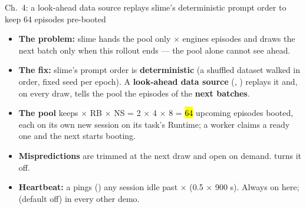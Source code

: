 \begin{frame}{Ch.\ 4: a look-ahead data source replays slime's deterministic prompt order to keep 64 episodes pre-booted}
\begin{itemize}\footnotesize\setlength{\itemsep}{1.8mm}
\item \textbf{The problem:} slime hands the pool only  $\times$ engines episodes and draws the next batch only when this rollout ends --- the pool alone cannot see ahead.
\item \textbf{The fix:} slime's prompt order is \textbf{deterministic} (a shuffled dataset walked in order, fixed seed per epoch). A \textbf{look-ahead data source} (, ) replays it and, on every draw, tells the pool the episodes of the \textbf{next  batches}.
\item \textbf{The pool} keeps  $\times$ RB $\times$ NS = 2 $\times$ 4 $\times$ 8 = \hl{64} upcoming episodes booted, each on its own new session on its task's Runtime; a worker claims a ready one and the next starts booting.
\item \textbf{Mispredictions} are trimmed at the next draw and open on demand.  turns it off.
\item \textbf{Heartbeat:} a  pings () any session idle past  $\times$  (0.5 $\times$ 900 s). Always on here;  (default off) in every other demo.
\end{itemize}
\end{frame}

